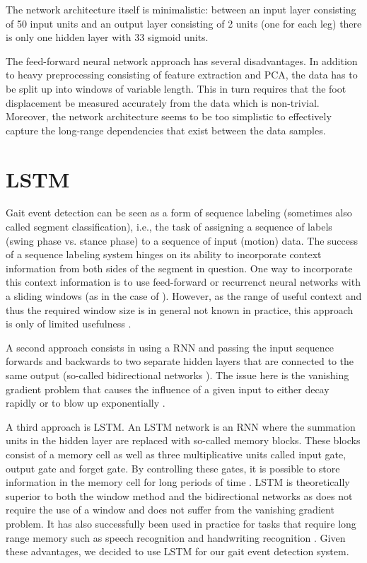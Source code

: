 \documentclass{acm_proc_article-sp}
\begin{document}
The network architecture itself is minimalistic: between an input layer
consisting of 50 input units and an output layer consisting of 2 units (one
for each leg) there is only one hidden layer with 33 sigmoid units.

The feed-forward neural network approach has several disadvantages.
In addition to heavy preprocessing consisting of feature extraction and PCA, the
data has to be split up into windows of variable length.
This in turn requires that the foot displacement be measured accurately from
the data which is non-trivial.
Moreover, the network architecture seems to be too simplistic to effectively
capture the long-range dependencies that exist between the data samples.

\section{LSTM}
\label{sec:LSTM}

Gait event detection can be seen as a form of sequence labeling (sometimes also
called segment classification), i.e., the task of assigning a sequence of labels
(swing phase vs. stance phase) to a sequence of input (motion) data.
The success of a sequence labeling system hinges on its ability to
incorporate context information from both sides of the segment in question.
%
One way to incorporate this context information is to use feed-forward or
recurrenct neural networks with a sliding windows (as in the case of
\cite{Miller2009}).
However, as the range of useful context and thus the required window size is in
general not known in practice, this approach is only of limited usefulness
\cite{Graves2012}.

A second approach consists in using a RNN and passing the
input sequence forwards and backwards to two separate hidden layers that are
connected to the same output (so-called bidirectional networks
\cite{Schuster1999}).
The issue here is the vanishing gradient problem that causes the influence of a
given input to either decay rapidly or to blow up exponentially
\cite{Hochreiter1991}.

A third approach is LSTM.
An LSTM network is an RNN where the summation units in the hidden layer are 
replaced with so-called memory blocks.
These blocks consist of a memory cell as well as three multiplicative units 
called input gate, output gate and forget gate.
By controlling these gates, it is possible to store information in the memory 
cell for long periods of time
\cite{Graves2012}.
LSTM is theoretically superior to both the window method and the bidirectional 
networks as does not require the use of a window and does not suffer 
from the vanishing gradient problem.
It has also successfully been used in practice for tasks that require long range 
memory such as speech recognition 
\cite{GravesSchmidhuber2005}
and handwriting recognition
\cite{Liwicki2007}.
Given these advantages, we decided to use LSTM for our gait event detection
system.
\end{document}

